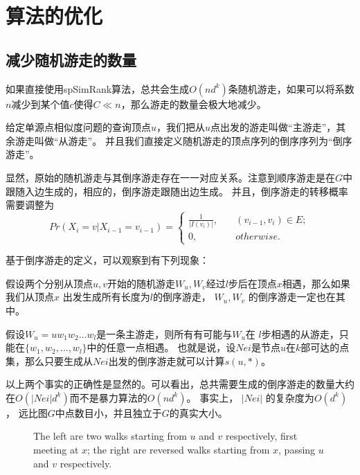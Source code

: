 \documentclass[master]{njuthesis}
\begin{document}
\section{算法的优化}
\subsection{减少随机游走的数量}
如果直接使用spSimRank算法，总共会生成$O(nd^k)$条随机游走，如果可以将系数$n$减少到某个值$c$使得$C \ll n$，那么游走的数量会极大地减少。
\begin{definition}[倒序游走]
 给定单源点相似度问题的查询顶点$u$，我们把从$u$点出发的游走叫做“主游走”，其余游走叫做“从游走”。 并且我们直接定义随机游走的顶点序列的倒序序列为“倒序游走”。
\end{definition}
显然，原始的随机游走与其倒序游走存在一一对应关系。注意到顺序游走是在$G$中跟随入边生成的，相应的，倒序游走跟随出边生成。
并且，倒序游走的转移概率需要调整为
\begin{equation}
Pr(X_i=v|X_{i-1}=v_{i-1}) = \left\{
        \begin{array}{ll}
	\frac{1}{|I(v_{i})|}, & \quad (v_{i-1}, v_i) \in E; \\
	0,  &\quad otherwise.
        \end{array}
    \right.
	\label{eq:eight}
\end{equation}

基于倒序游走的定义，可以观察到有下列现象：
\begin{fact}
假设两个分别从顶点$u, v$开始的随机游走$W_u, W_v$经过$l$步后在顶点$x$相遇，那么如果我们从顶点$x$ 出发生成所有长度为$l$的倒序游走，
$W_u, W_v$ 的倒序游走一定也在其中。
\end{fact}
\begin{fact}
 假设$W_u=uw_1w_2\dots w_l$是一条主游走，则所有有可能与$W_u$在 $l$步相遇的从游走，只能在$\{w_1, w_2, \dots, w_l\}$中的任意一点相遇。
 也就是说，设$Nei$是节点$u$在$k$部可达的点集，那么只要生成从$Nei$出发的倒序游走就可以计算$s(u,*)$。
\end{fact}
以上两个事实的正确性是显然的。可以看出，总共需要生成的倒序游走的数量大约在$O(|Nei|d^k)$而不是暴力算法的$O(nd^k)$。
事实上， $|Nei|$ 的复杂度为$O(d^k)$， 远比图$G$中点数目小，并且独立于$G$的真实大小。
\iffalse
\begin{figure}[h]
\centering
\label{fig:graph1}
\resizebox{!}{!}{}
\caption{The left are two walks starting from $u$ and $v$ respectively, first meeting at $x$; the right are reversed walks starting from $x$, passing $u$ and $v$ respectively.}\label{fig:one}
\end{figure}
\end{document}
